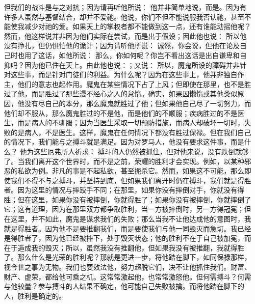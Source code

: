 但我们的战斗是与之对抗；因为请再听他所说： 他并非简单地说，而是。因为有许多人虽然与基督结合，却并不爱祂。他说，你们不但不能说服我否认祂，甚至不能使我减少对祂的爱。如果天上的掌权者都不能做到这一点，还有谁能动摇他呢？然而，他这样说并非因为他们实际在尝试，而是出于假设；因此他也说： 所以他没有挣扎，但仍惧怕他的诡计；因为请听他所说： 诚然，你会说，但他在论及自己时也用了这话，如他所说： 那么，你如何呢？你岂不看出这话是出自谦卑和自抑吗？因为他已住在天上。由此他也说：；又说： 所以，魔鬼所设的障碍并非针对这些事，而是针对门徒们的利益。为什么呢？因为在这些事上，他并非独自作主，他们的意志也起作用。魔鬼在某些情况下占了上风；但即使在那里，也不是胜过了他，而是胜过了那些漫不经心之人的怠惰。确实，如果因懒惰或其他类似原因，他没有尽自己的本分，那么魔鬼就胜过了他；但如果他自己尽了一切努力，而他们却不服从，那么魔鬼胜过的不是他，而是他们的不顺服；疾病胜过的不是医生，而是病人的不驯服；因为当医生采取一切预防措施，而病人却破坏一切时，失败的是病人，不是医生。这样，魔鬼在任何情况下都没有胜过保禄。但在我们自己的情况下，我们能与之搏斗就是满足。因为对罗马人，他没有要求这件事，而是什么？ 他为这些厄弗所人祈求： 搏斗的人仍然被抓住，但对他来说，没有跌倒就够了。当我们离开这个世界时，而不是之前，荣耀的胜利才会实现。例如，以某种邪恶的私欲为例。非凡的事是不起私欲，甚至扼杀它。然而，如果这不可能，那么即使我们不得不与之搏斗，并坚持到底，但如果我们离开时仍在搏斗，我们就是得胜者。因为这里的情况与摔跤手不同；在那里，如果你没有摔倒对手，你就没有得胜；但在这里，如果你没有被摔倒，你就得胜了；如果你没有被摔倒，你就摔倒了它；这有道理，因为在那里双方都争取胜利，当一方被摔倒时，另一方得冠冕；但在这里，并不如此，魔鬼是谋求我们的失败；那么当我不让他达成他的意图时，我就是得胜者。因为他不是要推翻我们，而是要使我们与他一同毁灭而急切。我已经是得胜者了，因为他已经被摔下，处于毁灭状态；他的胜利不在于自己被加冕，而在于造成我的毁灭；所以，虽然我没有推翻他，但如果我没有被推翻，我就得胜了。那么什么是光荣的胜利呢？那就是更进一步，将他踏在脚下，如同保禄那样，视今世之事为无物。我们也要效法他，努力超脱它们，决不让他抓住我们。财富、财产、虚荣，都给他可乘之机。这常常激起他，也常常激怒他。但何需搏斗？何需与他较量？参与搏斗的人结果不确定，他可能自己失败被擒。而将他踏在脚下的人，胜利是确定的。\par

